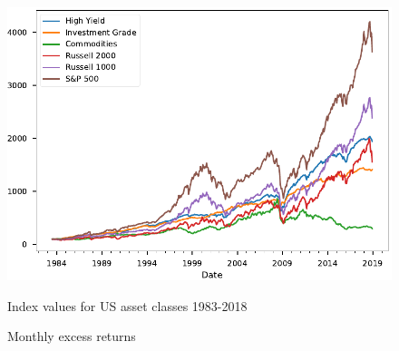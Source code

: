 \documentclass[11pt,a4paper,oneside]{article}
\begin{document}
\clearpage

\begin{figure}[ht]
\center
\caption{Index values for US asset classes 1983-2018}
\vspace{-0mm}
\label{index_levels}
\includegraphics[scale=1]{images/Prices.pdf}
\begingroup
{}
\endgroup
\end{figure}


\clearpage

\begin{figure}[p]
    \caption{Monthly excess returns}
\end{figure}
\end{document}
